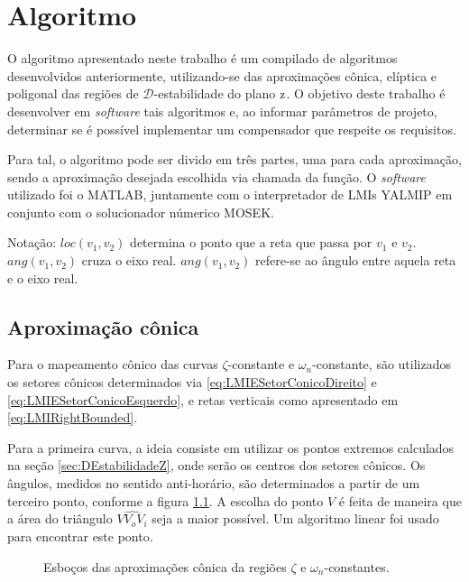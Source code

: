 \chapter{Algoritmo}

O algoritmo apresentado neste trabalho é um compilado de algoritmos desenvolvidos anteriormente, utilizando-se das aproximações cônica, elíptica e poligonal das regiões de $\mathscr{D}$-estabilidade do plano $\operatorname{\mathrm{z}}$. O objetivo deste trabalho é desenvolver em \emph{software} tais algoritmos e, ao informar parâmetros de projeto, determinar se é possível implementar um compensador que respeite os requisitos.

Para tal, o algoritmo pode ser divido em três partes, uma para cada aproximação, sendo a aproximação desejada escolhida via chamada da função. O \emph{software} utilizado foi o MATLAB, juntamente com o interpretador de LMIs YALMIP em conjunto com o solucionador númerico MOSEK.

Notação: $loc(v_1, v_2)$ determina o ponto que a reta que passa por $v_1$ e $v_2$. $ang(v_1, v_2)$ cruza o eixo real. $ang(v_1, v_2)$ refere-se ao ângulo entre aquela reta e o eixo real. 

\section{Aproximação cônica}
Para o mapeamento cônico das curvas $\zeta$-constante e $\omega_n$-constante, são utilizados os setores cônicos determinados via \eqref{eq:LMIESetorConicoDireito} e \eqref{eq:LMIESetorConicoEsquerdo}, e retas verticais como apresentado em \ref{eq:LMIRightBounded}.

Para a primeira curva, a ideia consiste em utilizar os pontos extremos calculados na seção \ref{sec:DEstabilidadeZ}, onde serão os centros dos setores cônicos. Os ângulos, medidos no sentido anti-horário, são determinados a partir de um terceiro ponto, conforme a figura \ref{subfig:AproximacaoConicaZeta}. A escolha do ponto $V$ é feita de maneira que a área do triângulo $\widehat{VV_oV_i}$ seja a maior possível. Um algoritmo linear foi usado para encontrar este ponto.

\begin{figure}[!hb]
  \centering
  \begin{subfigure}[t]{0.4\columnwidth}
      
      \caption{}
      \label{subfig:AproximacaoConicaZeta}
  \end{subfigure}
  \begin{subfigure}[t]{0.4\columnwidth}
      
      \caption{}
      \label{subfig:AproximacaoConicaWn}
  \end{subfigure}
  \caption{Esboços das aproximações cônica da regiões $\zeta$ e $\omega_n$-constantes.}
  \label{fig:AproximacoesConica}
\end{figure}

